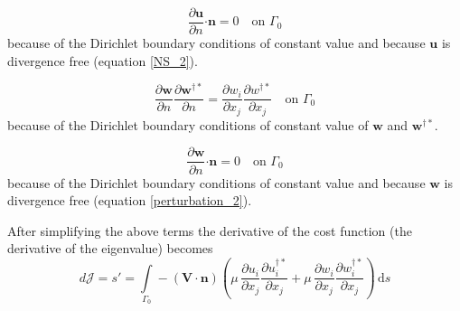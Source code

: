 \documentclass[12pt, a4paper]{article}
\begin{document}
\begin{equation*}
\frac{\partial \mathbf{u}}{\partial n} \mathbf{\cdot n} = 0 \quad \text{on } \Gamma_0
\end{equation*}
because of the Dirichlet boundary conditions of constant value and because $\mathbf{u}$ is divergence free (equation \ref{NS_2}).

\begin{equation*}
\frac{\partial \mathbf{w}}{\partial n} \frac{\partial \mathbf{w^{\dagger*}}}{\partial n} = 
\frac{\partial w_i}{\partial x_j} \frac{\partial w^{\dagger*}}{\partial x_j}
\quad \text{on } \Gamma_0
\end{equation*}
because of the Dirichlet boundary conditions of constant value of $\mathbf{w}$ and $\mathbf{w^{\dagger*}}$.

\begin{equation*}
\frac{\partial \mathbf{w}}{\partial n} \mathbf{\cdot n} = 0 \quad \text{on } \Gamma_0
\end{equation*}
because of the Dirichlet boundary conditions of constant value and because $\mathbf{w}$ is divergence free (equation \ref{perturbation_2}).

After simplifying the above terms the derivative of the cost function (the derivative of the eigenvalue) becomes 
\begin{equation}
d \mathcal{J} = s' = \int\limits_{\Gamma_0} - (\mathbf{V \cdot n}) \left( 
\mu \, \frac{\partial u_i}{\partial x_j} \frac{\partial u^{\dagger*}_i}{\partial x_j} + 
\mu \, \frac{\partial w_i}{\partial x_j} \frac{\partial w^{\dagger*}_i}{\partial x_j}
\right) \, \mathrm{d} s 
\end{equation}



\end{document}
